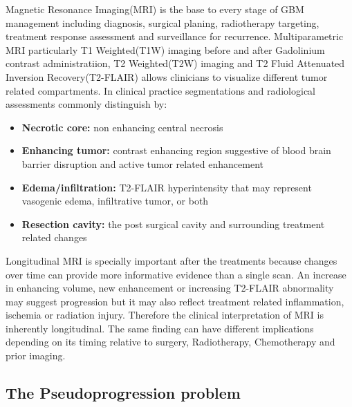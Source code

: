 Magnetic Resonance Imaging(MRI) is the base to every stage of GBM management including diagnosis, surgical 
planing, radiotherapy targeting, treatment response assessment and surveillance for recurrence. Multiparametric 
MRI particularly T1 Weighted(T1W) imaging before and after Gadolinium contrast administratiion, T2 Weighted(T2W) 
imaging and T2 Fluid Attenuated Inversion Recovery(T2-FLAIR) allows clinicians to visualize different tumor 
related compartments. In clinical practice segmentations and radiological assessments commonly distinguish by\cite{almeida2017advanced,FalkDelgado2025}:

\begin{itemize}
    \item \textbf{Necrotic core:} non enhancing central necrosis
    \item \textbf{Enhancing tumor:} contrast enhancing region suggestive of blood brain barrier disruption and active tumor related enhancement
    \item \textbf{Edema/infiltration:} T2-FLAIR hyperintensity that may represent vasogenic edema, infiltrative tumor, or both
    \item \textbf{Resection cavity:} the post surgical cavity and surrounding treatment related changes
\end{itemize}

Longitudinal MRI is specially important after the treatments because changes over time can provide more informative evidence than a single scan. An increase in enhancing volume, new enhancement or increasing T2-FLAIR abnormality may suggest progression but it may also reflect treatment related inflammation, ischemia or radiation injury. Therefore the clinical interpretation of MRI is inherently longitudinal. The same finding can have different implications depending on its timing relative to surgery, Radiotherapy, Chemotherapy and prior imaging.\cite{ellingson2017pseudoprogression}

\subsection{The Pseudoprogression problem}


